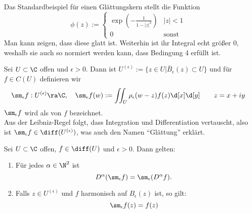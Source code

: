 \begin{bsp}
  Das Standardbeispiel für einen Glättungskern stellt die Funktion
  \[
  \phi(z) :=
  \begin{cases}
    \exp \left ( - \frac{1}{1 - |z|^2} \right ) & |z| < 1 \\
    0 & \text{sonst}
  \end{cases}
  \]
  Man kann zeigen, dass diese glatt ist. Weiterhin ist ihr Integral
  echt größer 0, weshalb sie auch so normiert werden kann, dass
  Bedingung 4 erfüllt ist.
\end{bsp}

\begin{defin}
  Sei $U \subset \C$ offen und $\epsilon > 0$. Dann ist
  $U^{(\epsilon)} := \{z \in U | \bar B_\epsilon(z) \subset U \}$ und
  für $f \in C(U)$ definieren wir
  \[
  \sm_\epsilon f : U^{(\epsilon)} \ra \C, \quad \sm_\epsilon f(w) :=
  \iint_U \rho_\epsilon(w- z) f(z) \d[x]\d[y] \qquad z = x + iy
  \]
  $\sm_\epsilon f$ wird als  von $f$ bezeichnet. \\
  Aus der Leibniz-Regel folgt, dass Integration und Differentiation
  vertauscht, also ist $\sm_\epsilon f \in \diff(U^{(\epsilon)})$, was
  auch den Namen "`Glättung"' erklärt.
\end{defin}


\begin{lemma}
  \label{lemma:glättung-eigenschaften}
  Sei $U \subset \C$ offen, $f \in \diff(U)$ und $\epsilon > 0 $. Dann
  gelten:
  \begin{enumerate}
  \item Für jedes $\alpha \in \N^2$ ist
    \[
    D^\alpha( \sm_\epsilon f) =
    \sm_\epsilon (D^\alpha f).
    \]
  \item Falls $z \in U^{(\epsilon)}$ und $f$ harmonisch auf
    $B_\epsilon(z)$ ist, so gilt:
    \[
    \sm_\epsilon f(z) = f(z)
    \]
  \end{enumerate}
\end{lemma}


